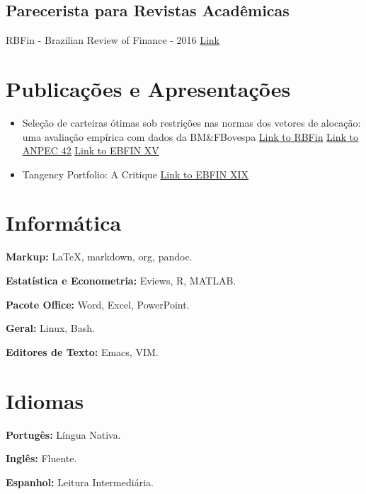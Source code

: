 \documentclass[10pt,a4paper]{article}
\begin{document}
\vspace{-1 em}
\subsection{Parecerista para Revistas Acadêmicas}

RBFin - Brazilian Review of Finance - 2016
\href{http://bibliotecadigital.fgv.br/ojs/index.php/rbfin/article/view/70380/67907}{Link}

\vspace{-1.5 em}
\section{Publicações e Apresentações}

\begin{itemize}[noitemsep]
\item
Seleção de carteiras ótimas sob restrições nas normas dos vetores de alocação: uma avaliação empírica com dados da BM\&FBovespa
\hspace{2pt}
\href{http://bibliotecadigital.fgv.br/ojs/index.php/rbfin/article/view/52081}{Link to RBFin}
\hspace{2pt}
\href{https://www.anpec.org.br/encontro/2014/submissao/files_I/i8-4ddb23813d689d5ae684d5162e07302a.pdf}{Link to ANPEC 42}
\hspace{2pt}
\href{http://bibliotecadigital.fgv.br/ocs/index.php/ebf/15EBFin/paper/view/4971}{Link to EBFIN XV}

\item
Tangency Portfolio: A Critique
\hspace{2pt}
\href{http://sbfin.org.br/files/relatorio_de_artigos_final.pdf}{Link to EBFIN XIX}
\end{itemize}

\vspace{-1.5 em}
\section{Informática}

\textbf{Markup:} \LaTeX, markdown, org, pandoc.

\textbf{Estatística e Econometria:} Eviews, R, MATLAB.

\textbf{Pacote Office:} Word, Excel, PowerPoint.

\textbf{Geral:} Linux, Bash.

\textbf{Editores de Texto:} Emacs, VIM.

\vspace{-1.5 em}
\section{Idiomas}

\textbf{Portugês:} Língua Nativa.

\textbf{Inglês:} Fluente.

\textbf{Espanhol:} Leitura Intermediária.

\end{document}
